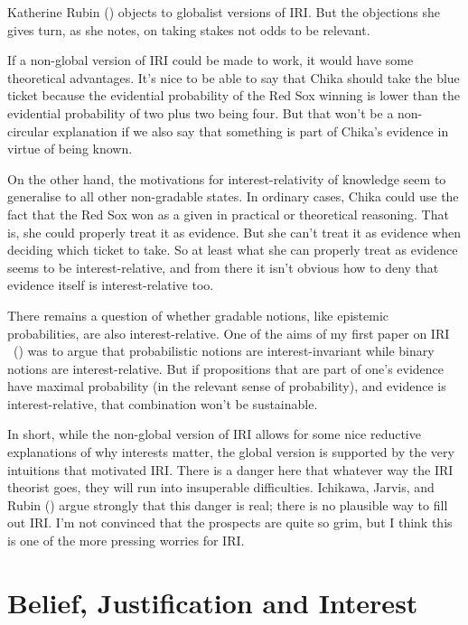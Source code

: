 \documentclass[
  11pt,
  letterpaper,
  DIV=11,
  numbers=noendperiod,
  twoside]{scrartcl}
\begin{document}
Katherine Rubin () objects to globalist
versions of IRI. But the objections she gives turn, as she notes, on
taking stakes not odds to be relevant.

If a non-global version of IRI could be made to work, it would have some
theoretical advantages. It's nice to be able to say that Chika should
take the blue ticket because the evidential probability of the Red Sox
winning is lower than the evidential probability of two plus two being
four. But that won't be a non-circular explanation if we also say that
something is part of Chika's evidence in virtue of being known.

On the other hand, the motivations for interest-relativity of knowledge
seem to generalise to all other non-gradable states. In ordinary cases,
Chika could use the fact that the Red Sox won as a given in practical or
theoretical reasoning. That is, she could properly treat it as evidence.
But she can't treat it as evidence when deciding which ticket to take.
So at least what she can properly treat as evidence seems to be
interest-relative, and from there it isn't obvious how to deny that
evidence itself is interest-relative too.

There remains a question of whether gradable notions, like epistemic
probabilities, are also interest-relative. One of the aims of my first
paper on IRI ~() was to
argue that probabilistic notions are interest-invariant while binary
notions are interest-relative. But if propositions that are part of
one's evidence have maximal probability (in the relevant sense of
probability), and evidence is interest-relative, that combination won't
be sustainable.

In short, while the non-global version of IRI allows for some nice
reductive explanations of why interests matter, the global version is
supported by the very intuitions that motivated IRI. There is a danger
here that whatever way the IRI theorist goes, they will run into
insuperable difficulties. Ichikawa, Jarvis, and Rubin
() argue strongly that this danger
is real; there is no plausible way to fill out IRI. I'm not convinced
that the prospects are quite so grim, but I think this is one of the
more pressing worries for IRI.

\section{Belief, Justification and
Interest}\label{beliefjustificationandinterest}
\end{document}
